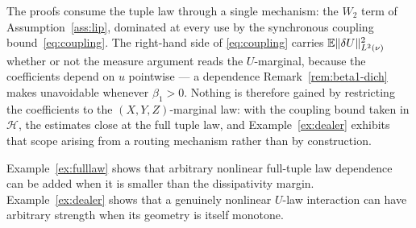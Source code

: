 \begin{remark}\label{rem:freelaw}
The proofs consume the tuple law through a single mechanism: the $W_2$ term of
Assumption~\ref{ass:lip}, dominated at every use by the synchronous coupling
bound~\eqref{eq:coupling}. The right-hand side of \eqref{eq:coupling} carries
$\mathbb{E}\lVert \delta U\rVert_{L^2(\nu)}^2$ whether or not the measure argument reads the $U$-marginal,
because the coefficients depend on $u$ pointwise --- a dependence
Remark~\ref{rem:beta1-dich} makes unavoidable whenever $\beta_1>0$. Nothing is therefore gained by restricting the
coefficients to the $(X,Y,Z)$-marginal law: with the coupling bound taken in
$\mathcal H$, the estimates close at the full tuple law, and Example~\ref{ex:dealer}
exhibits that scope arising from a routing mechanism rather than by construction.
\end{remark}

\begin{remark}\label{rem:regimes}
Example~\ref{ex:fulllaw} shows that arbitrary nonlinear full-tuple law dependence can be
added when it is smaller than the dissipativity margin. Example~\ref{ex:dealer} shows
that a genuinely nonlinear $U$-law interaction can have arbitrary strength when its
geometry is itself monotone.
\end{remark}

